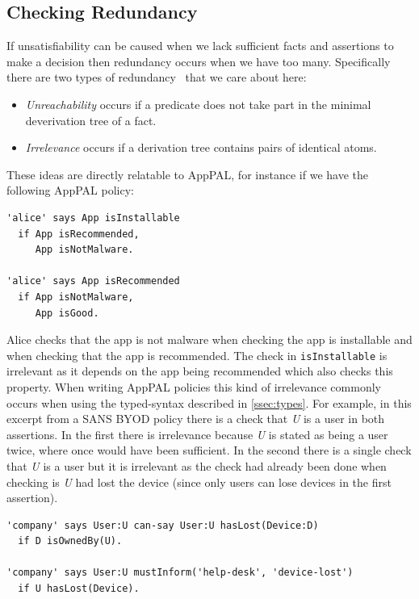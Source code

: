 \documentclass[thesis.tex]{subfiles}
\begin{document}
\subsection{Checking Redundancy}
\label{ssec:redundancy}

If unsatisfiability can be caused when we lack sufficient facts and assertions
to make a decision then redundancy occurs when we have too many. Specifically
there are two types of redundancy~\cite{alon_levy_constraints_1992} that we care
about here:

\begin{itemize}
\item \emph{Unreachability} occurs if a predicate does not take part in the
  minimal deverivation tree of a fact.
\item \emph{Irrelevance} occurs if a derivation tree contains pairs of identical atoms.
\end{itemize}

These ideas are directly relatable to AppPAL, for instance if we have the
following AppPAL policy:

\begin{lstlisting}
'alice' says App isInstallable
  if App isRecommended,
     App isNotMalware.

'alice' says App isRecommended
  if App isNotMalware,
     App isGood.
\end{lstlisting}

Alice checks that the app is not malware when checking the app is
installable and when checking that the app is recommended.  The check
in \texttt{isInstallable} is irrelevant as it depends on the app being
recommended which also checks this property.  When writing AppPAL
policies this kind of irrelevance commonly occurs when using the
typed-syntax described in \autoref{ssec:types}. For example, in this
excerpt from a SANS BYOD policy there is a check that \emph{U} is a
user in both assertions.  In the first there is irrelevance because
\emph{U} is stated as being a user twice, where once would have been
sufficient.  In the second there is a single check that \emph{U} is a
user but it is irrelevant as the check had already been done when
checking is \emph{U} had lost the device (since only users can lose
devices in the first assertion).

\begin{lstlisting}
'company' says User:U can-say User:U hasLost(Device:D)
  if D isOwnedBy(U).

'company' says User:U mustInform('help-desk', 'device-lost')
  if U hasLost(Device).
\end{lstlisting}
\end{document}
